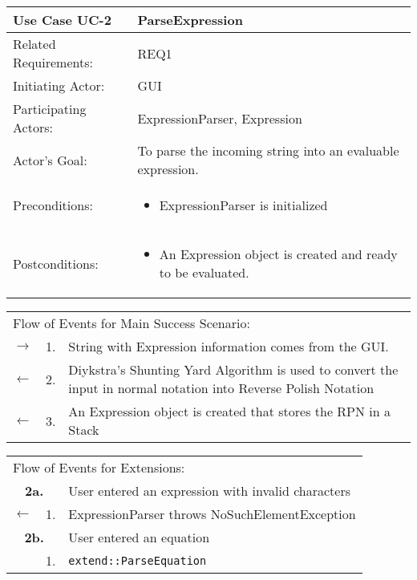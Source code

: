 \documentclass[11pt]{article}
\newcommand{\code}[1]{\texttt{#1}}
\begin{document}
\newpage

\begin{center}
\begin{tabular}{p{1.5in}p{5in}}
\hline
\textbf{Use Case UC-2}     & \textbf{ParseExpression} \\ \hline
Related Requirements: & REQ1 \\
Initiating Actor:     & GUI \\
Participating Actors: & ExpressionParser, Expression \\
Actor's Goal:          & To parse the incoming string into an evaluable expression. \\
Preconditions:         & \begin{itemize}[nosep]
		      \item  ExpressionParser is initialized
                         \end{itemize} \\
Postconditions:        & \begin{itemize}[nosep]
                         \item An Expression object is created and ready to be evaluated.
                         \end{itemize} \\ \hline
\end{tabular}

\begin{tabular}{p{.25in}p{.25in}p{5.8in}}
\multicolumn{3}{l}{Flow of Events for Main Success Scenario:} \\
$\rightarrow$ & 1. & String with Expression information comes from the GUI. \\
$\leftarrow$  & 2. & Diykstra's Shunting Yard Algorithm is used to convert the input in normal notation into Reverse Polish Notation\\
$\leftarrow$  & 3. & An Expression object is created that stores the  RPN in a Stack \\
\end{tabular}

\begin{tabular}{p{.25in}p{.25in}p{5.8in}}
\multicolumn{3}{l}{Flow of Events for Extensions:} \\
\multicolumn{2}{c}{\textbf{2a.}} & User entered an expression with invalid characters \\
$\leftarrow$  & 1.           & ExpressionParser throws NoSuchElementException\\

\multicolumn{2}{c}{\textbf{2b.}} & User entered an equation\\
 & 1.           & \code{extend::ParseEquation}\\

\end{tabular}
\end{center}
\end{document}

